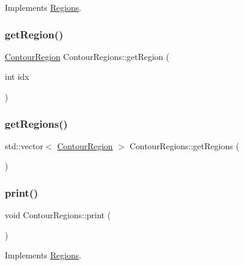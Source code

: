 Implements \hyperlink{struct_regions_ae2bcea2b1c245a9d1ab1ff3abc23f2a0}{Regions}.

\mbox{\label{struct_contour_regions_a94961450720d9735337195dee1fd8b53}} 
\subsubsection{\texorpdfstring{get\+Region()}{getRegion()}}
{\footnotesize\ttfamily \hyperlink{struct_contour_region}{Contour\+Region} Contour\+Regions\+::get\+Region (\begin{DoxyParamCaption}\item[{int}]{idx }\end{DoxyParamCaption})}

\mbox{\label{struct_contour_regions_aa48956c2ee10e312023b721ca4adcd07}} 
\subsubsection{\texorpdfstring{get\+Regions()}{getRegions()}}
{\footnotesize\ttfamily std\+::vector$<$ \hyperlink{struct_contour_region}{Contour\+Region} $>$ Contour\+Regions\+::get\+Regions (\begin{DoxyParamCaption}{ }\end{DoxyParamCaption})}

\mbox{\label{struct_contour_regions_a9bd987b6b8a1cc27f5ece5b321f1b9ba}} 
\subsubsection{\texorpdfstring{print()}{print()}}
{\footnotesize\ttfamily void Contour\+Regions\+::print (\begin{DoxyParamCaption}{ }\end{DoxyParamCaption})\hspace{0.3cm}{\ttfamily [virtual]}}



Implements \hyperlink{struct_regions_a5a19f40bc0d2226f244625b88fbf8e59}{Regions}.

